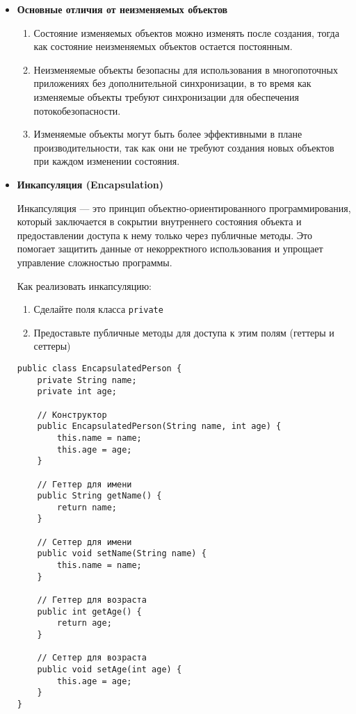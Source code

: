 \begin{itemize}
    \item \textbf{Основные отличия от неизменяемых объектов} \par
    \begin{enumerate}
        \item Состояние изменяемых объектов можно изменять после создания, тогда как состояние неизменяемых объектов остается постоянным.
        \item Неизменяемые объекты безопасны для использования в многопоточных приложениях без дополнительной синхронизации, в то время как изменяемые объекты требуют синхронизации для обеспечения потокобезопасности.
        \item Изменяемые объекты могут быть более эффективными в плане производительности, так как они не требуют создания новых объектов при каждом изменении состояния.
    \end{enumerate}

    \item \textbf{Инкапсуляция (Encapsulation)} \par
    Инкапсуляция — это принцип объектно-ориентированного программирования, который заключается в сокрытии внутреннего состояния объекта и предоставлении доступа к нему только через публичные методы. Это помогает защитить данные от некорректного использования и упрощает управление сложностью программы. \par

    Как реализовать инкапсуляцию:
    \begin{enumerate}
        \item Сделайте поля класса \texttt{private}
        \item Предоставьте публичные методы для доступа к этим полям (геттеры и сеттеры)
    \end{enumerate}

    \begin{verbatim}
public class EncapsulatedPerson {
    private String name;
    private int age;

    // Конструктор
    public EncapsulatedPerson(String name, int age) {
        this.name = name;
        this.age = age;
    }

    // Геттер для имени
    public String getName() {
        return name;
    }

    // Сеттер для имени
    public void setName(String name) {
        this.name = name;
    }

    // Геттер для возраста
    public int getAge() {
        return age;
    }

    // Сеттер для возраста
    public void setAge(int age) {
        this.age = age;
    }
}   
    \end{verbatim}

\end{itemize}